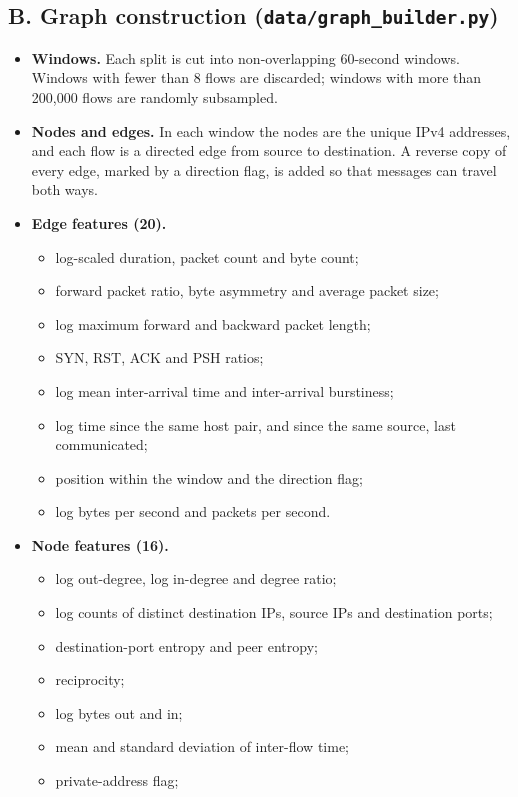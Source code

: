 \documentclass[12pt,a4paper]{report}
\begin{document}
\subsection*{B. Graph construction (\texttt{data/graph\_builder.py})}
\begin{itemize}
    \item \textbf{Windows.} Each split is cut into non-overlapping 60-second windows. Windows with fewer than 8 flows are discarded; windows with more than 200{,}000 flows are randomly subsampled.
    \item \textbf{Nodes and edges.} In each window the nodes are the unique IPv4 addresses, and each flow is a directed edge from source to destination. A reverse copy of every edge, marked by a direction flag, is added so that messages can travel both ways.
    \item \textbf{Edge features (20).}
    \begin{itemize}
        \item log-scaled duration, packet count and byte count;
        \item forward packet ratio, byte asymmetry and average packet size;
        \item log maximum forward and backward packet length;
        \item SYN, RST, ACK and PSH ratios;
        \item log mean inter-arrival time and inter-arrival burstiness;
        \item log time since the same host pair, and since the same source, last communicated;
        \item position within the window and the direction flag;
        \item log bytes per second and packets per second.
    \end{itemize}
    \item \textbf{Node features (16).}
    \begin{itemize}
        \item log out-degree, log in-degree and degree ratio;
        \item log counts of distinct destination IPs, source IPs and destination ports;
        \item destination-port entropy and peer entropy;
        \item reciprocity;
        \item log bytes out and in;
        \item mean and standard deviation of inter-flow time;
        \item private-address flag;

\end{itemize}
\end{itemize}
\end{document}
